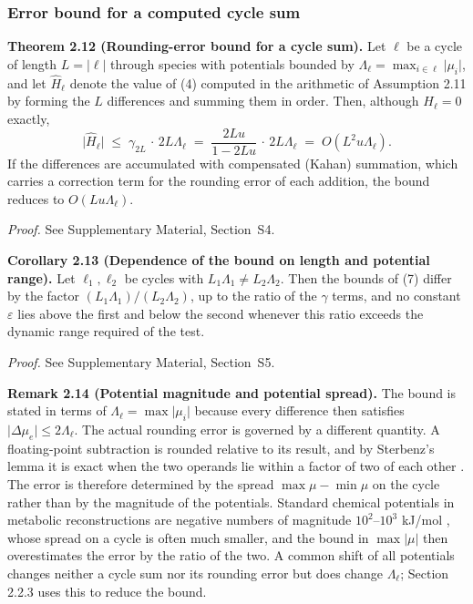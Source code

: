 \documentclass[11pt,a4paper]{article}
\theoremstyle{pstyle}
\theoremstyle{definition}
\theoremstyle{remark}
\newcommand{\abs}[1]{\lvert#1\rvert}
\newcommand{\eps}{\varepsilon}
\newcommand{\hol}{H}
\newcommand{\mach}{u}
\begin{document}
\subsubsection{Error bound for a computed cycle sum}

\par\noindent\textbf{Theorem 2.12 (Rounding-error bound for a cycle sum).}\label{thm:noise-scale} 
Let $\ell$ be a cycle of length $L=\abs{\ell}$ through species with
potentials bounded by $\Lambda_\ell = \max_{i\in\ell}\abs{\mu_i}$, and
let $\widehat{\hol}_\ell$ denote the value of (4)
computed in the arithmetic of Assumption 2.11 by forming the $L$
differences and summing them in order. Then, although
$\hol_\ell = 0$ exactly,
\begin{equation}
  \bigl\lvert\widehat{\hol}_\ell\bigr\rvert
  \;\le\; \gamma_{2L}\,\cdot\,2L\Lambda_\ell
  \;=\; \frac{2L\mach}{1-2L\mach}\,\cdot\,2L\Lambda_\ell
  \;=\; O\!\left(L^{2}\mach\Lambda_\ell\right).
  \label{eq:noise-bound}
\end{equation}
If the differences are accumulated with compensated (Kahan) summation,
which carries a correction term for the rounding error of each
addition, the bound reduces to $O(L\mach\Lambda_\ell)$.
\par

\noindent\emph{Proof.} See Supplementary Material, Section~S4.

\par\noindent\textbf{Corollary 2.13 (Dependence of the bound on length and potential range).}\label{cor:no-constant} 
Let $\ell_1,\ell_2$ be cycles with $L_1\Lambda_1 \ne L_2\Lambda_2$. Then
the bounds of (7) differ by the factor
$(L_1\Lambda_1)/(L_2\Lambda_2)$, up to the ratio of the $\gamma$ terms,
and no constant $\eps$ lies above the first and below the second
whenever this ratio exceeds the dynamic range required of the test.
\par

\noindent\emph{Proof.} See Supplementary Material, Section~S5.

\par\noindent\textbf{Remark 2.14 (Potential magnitude and potential spread).}\label{rem:lambda} 
The bound is stated in terms of $\Lambda_\ell=\max\abs{\mu_i}$ because
every difference then satisfies $\abs{\Delta\mu_e}\le 2\Lambda_\ell$.
The actual rounding error is governed by a different quantity. A
floating-point subtraction is rounded relative to its result, and by
Sterbenz's lemma it is exact when the two operands lie within a factor
of two of each other \citep{goldberg1991,higham2002}. The error is
therefore determined by the spread $\max\mu-\min\mu$ on the cycle rather
than by the magnitude of the potentials. Standard chemical potentials in
metabolic reconstructions are negative numbers of magnitude
$10^{2}$--$10^{3}$ kJ/mol \citep{alberty1998,noor2013}, whose spread on
a cycle is often much smaller, and the bound in $\max\abs{\mu}$ then
overestimates the error by the ratio of the two. A common shift of all
potentials changes neither a cycle sum nor its rounding error but does
change $\Lambda_\ell$; Section 2.2.3 uses this to reduce the bound.
\par
\end{document}
